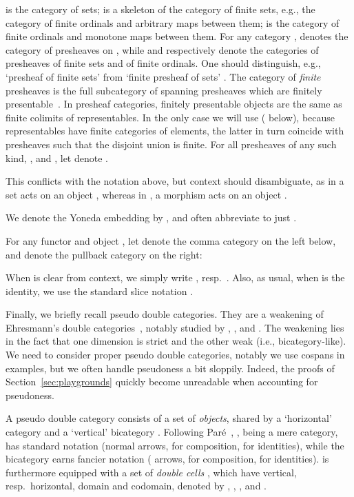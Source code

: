 \documentclass{LMCS}
\theoremstyle{plain}\newtheorem{satz}[thm]{Satz}
\begin{document}
 is the category of sets;  is a skeleton of the category
of finite sets, e.g., the category of finite ordinals and arbitrary
maps between them;  is the category of finite ordinals and
monotone maps between them.  For any category ,  denotes the category of presheaves on , while
 and 
respectively denote the categories of presheaves of finite sets and of
finite ordinals.  One should distinguish, e.g., `presheaf of finite
sets'  from `finite presheaf of sets' . The category  of \emph{finite} presheaves is the
full subcategory of  spanning presheaves  which are
finitely presentable~\cite{Adamek}. In presheaf categories, finitely
presentable objects are the same as finite colimits of
representables. In the only case we will use ( below), because
representables have finite categories of elements, the latter in turn
coincide with presheaves  such that the disjoint union  is finite.  For all presheaves  of any such
kind, , and , let  denote
.
\begin{rem}
  This conflicts with the notation  above, but context
  should disambiguate, as in  a set  acts on an object
  , whereas in , a morphism  acts on an object .
\end{rem}
We denote the Yoneda embedding by
, and often abbreviate  to
just .

For any functor  and object , let 
 denote the comma category on the left below, and 
 denote the pullback category on the right:
  
When  is clear from context, we simply write , resp.\
. Also, as usual, when  is the identity,
we use the standard slice notation .

Finally, we briefly recall pseudo double categories. They are a
weakening of Ehresmann's double
categories~\citep{Ehresmann:double,Ehresmann:double2}, notably studied
by \citet{GrandisPare,GrandisPareAdjoints}, \citet{LeinsterHC}, and
\citet{GarnerPhD}.  The weakening lies in the fact that one dimension
is strict and the other weak (i.e., bicategory-like).  We need to
consider proper pseudo double categories, notably we use cospans in
examples, but we often handle pseudoness a bit sloppily.  Indeed, the
proofs of Section~\ref{sec:playgrounds} quickly become unreadable when
accounting for pseudoness.


A pseudo double category  consists of a set  of
\emph{objects}, shared by a `horizontal' category  and a
`vertical' bicategory . Following Paré~\cite{PareYoneda}, ,
being a mere category, has standard notation (normal arrows, 
for composition,  for identities), while the bicategory 
earns fancier notation ( arrows,  for composition,
 for identities).  is furthermore equipped with a set of
\emph{double cells} , which have vertical, resp.\ horizontal,
domain and codomain, denoted by , ,
, and . 
\end{document}
